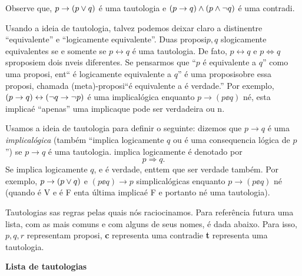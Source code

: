 Observe que, $p\to (p\vee q)$ \'e uma tautologia e $(p\to q)\wedge(p \wedge \lnot q)$ \'e uma contradi\caoi.

Usando a ideia de tautologia, talvez podemos deixar claro a distin\cao entre ``equivalente'' e ``logicamente equivalente''. Duas proposi\coes $p,q$ s\ao logicamente equivalentes se e somente se $p \leftrightarrow q$ \'e uma tautologia. De fato, $p \leftrightarrow q$ e $p\iff q$ s\ao proposi\coes em dois n\ih veis diferentes. Se pensarmos que ``$p$ \'e equivalente a $q$'' como uma proposi\caoi, ent\ao `` \pp \'e logicamente equivalente a $q$'' \'e uma proposi\cao sobre essa proposi\cao, chamada (meta)-proposi\cao ``\pp \'e equivalente a \qq \'e verdade.'' Por exemplo, $(p\to q)\leftrightarrow(\lnot q \to \lnot p)$ \'e uma implica\cao l\'ogica enquanto $p\to(p\ee q)$ n\ao \'e, esta implica\cao \'e ``apenas'' uma implica\cao que pode ser verdadeira ou n\aoi.

Usamos a ideia de tautologia para definir o seguinte: dizemos que $p\to q$ \'e uma {\it implica\cao l\'ogica} (tamb\'em ``\pp implica logicamente $q$ ou \qq \'e uma consequencia l\'ogica de $p$'') se $p\to q$ \'e uma tautologia. \pp  implica logicamente \qq \'e denotado por
\[
p \Rightarrow q.
\]
Se \pp implica logicamente $q$, e \pp \'e verdade, ent\ao \qq tem que ser verdade tamb\'em. Por exemplo, $p\to(p\vee q)$ e $(p \ee q)\to p$ s\ao implica\coes l\'ogicas enquanto $p\to(p\ee q)$ n\ao \'e (quando \pp \'e V e \qq \'e F ent\ao a \'ultima implica\cao \'e F e portanto n\ao \'e uma tautologia).

Tautologias s\ao as regras pelas quais n\'os raciocinamos. Para refer\^encia futura uma lista, com as mais comuns e com alguns de seus nomes, \'e dada abaixo. Para isso, $p,q,r$ representam proposi\cois, {\bf c} representa uma contradi\cao e {\bf t} representa uma tautologia.
\newpage


{\bf Lista de tautologias}

